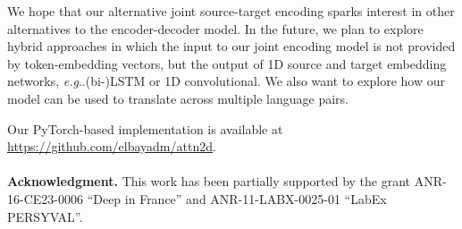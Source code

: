 \documentclass[11pt,a4paper]{article}
\makeatletter
\DeclareRobustCommand\onedot{\futurelet\@let@token\@onedot}
\def\@onedot{\ifx\@let@token.\else.\null\fi\xspace}
\def\eg{\emph{e.g}\onedot} \def\Eg{\emph{E.g}\onedot}
\makeatother
\begin{document}
We hope that our alternative joint source-target encoding sparks interest in other alternatives to the encoder-decoder model.
In the future, we plan to explore hybrid approaches in which the input to our joint encoding model is not provided by token-embedding vectors, but the output of 1D source and target embedding networks, \eg \mbox{(bi-)LSTM} or 1D convolutional.
We also want to explore how our model can be used to translate across multiple language pairs. 






Our PyTorch-based implementation is available at \url{https://github.com/elbayadm/attn2d}.
\\\\
{{\bf Acknowledgment.} 
This work has been partially supported by the grant ANR-16-CE23-0006 ``Deep in France'' and ANR-11-LABX-0025-01 ``LabEx PERSYVAL''.
} {}


 


\end{document}

